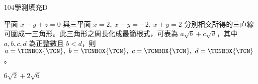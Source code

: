     \begin{QUESTION}
        \begin{ExamInfo}{104}{學測}{填充}{D}
        \end{ExamInfo}
        \begin{ExamAnsRateInfo}{13}{36}{3}{0}
        \end{ExamAnsRateInfo}
        \begin{QBODY}
            平面 $x-y+z=0$ 與三平面 $x=2,\ x-y=-2,\ x+y=2$ 分別相交所得的三直線可圍成一三角形。此三角形之周長化成最簡根式，可表為 $a\sqrt{b}+c\sqrt{d}$，其中 $a,b,c,d$ 為正整數且 $b<d$，則 $a=\TCNBOX{\TCN },\ b=\TCNBOX{\TCN },\ c=\TCNBOX{\TCN },\ d=\TCNBOX{\TCN }$。
        \end{QBODY}
        \begin{QFROMS}
        \end{QFROMS}
        \begin{QTAGS}\end{QTAGS}
        \begin{QANS}
            $6 \sqrt{2} + 2\sqrt{6}$
        \end{QANS}
        \begin{QSOLLIST}
\end{QSOLLIST}
\end{QUESTION}
